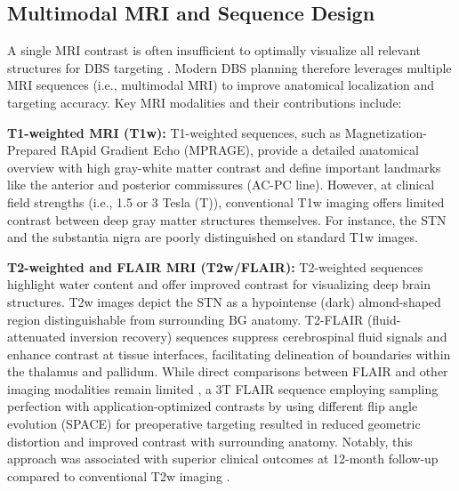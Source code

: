 \subsection{Multimodal MRI and Sequence Design}
A single MRI contrast is often insufficient to optimally visualize all relevant structures for DBS targeting \cite{Boutet2021-vg,Treu2020-ih}. Modern DBS planning therefore leverages multiple MRI sequences (i.e., multimodal MRI) to improve anatomical localization and targeting accuracy. Key MRI modalities and their contributions include:

\textbf{T1-weighted MRI (T1w):} T1-weighted sequences, such as Magnetization-Prepared RApid Gradient Echo (MPRAGE), provide a detailed anatomical overview with high gray-white matter contrast \cite{Brant-Zawadzki1992-nw} and define important landmarks like the anterior and posterior commissures (AC-PC line). However, at clinical field strengths (i.e., 1.5 or 3 Tesla (T)), conventional T1w imaging offers limited contrast between deep gray matter structures themselves. For instance, the STN and the substantia nigra are poorly distinguished on standard T1w images.

\textbf{T2-weighted and FLAIR MRI (T2w/FLAIR):} T2-weighted sequences highlight water content and offer improved contrast for visualizing deep brain structures. T2w images depict the STN as a hypointense (dark) almond-shaped region distinguishable from surrounding BG anatomy. T2-FLAIR (fluid-attenuated inversion recovery) sequences suppress cerebrospinal fluid signals and enhance contrast at tissue interfaces, facilitating delineation of boundaries within the thalamus and pallidum. While direct comparisons between FLAIR and other imaging modalities remain limited \cite{Boutet2021-vg}, a 3T FLAIR sequence employing sampling perfection with application-optimized contrasts by using different flip angle evolution (SPACE) for preoperative targeting resulted in reduced geometric distortion and improved contrast with surrounding anatomy. Notably, this approach was associated with superior clinical outcomes at 12-month follow-up compared to conventional T2w imaging \cite{Senova2016-bh}.

